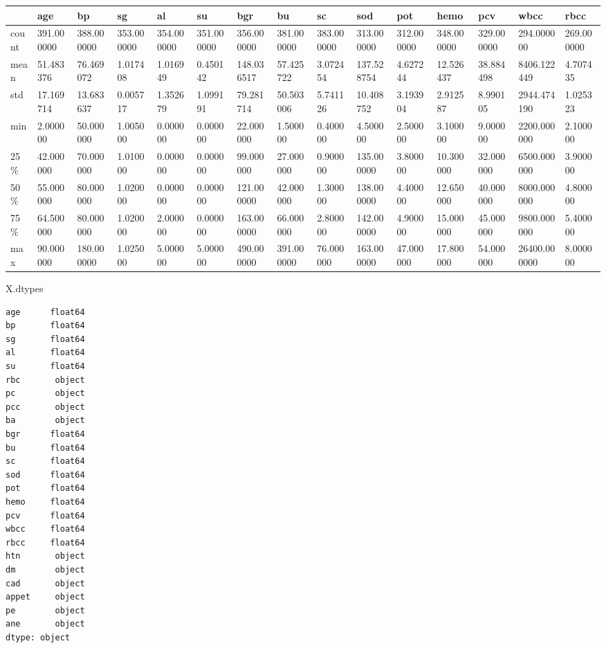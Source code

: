 \documentclass[
  11pt,
  letterpaper,
  DIV=11,
  numbers=noendperiod]{scrartcl}
\newenvironment{Shaded}{\begin{snugshade}}{\end{snugshade}}
\newcommand{\NormalTok}[1]{\textcolor[rgb]{0.00,0.23,0.31}{#1}}
\begin{document}
\begin{longtable}[]{@{}lllllllllllllll@{}}
\toprule\noalign{}
& age & bp & sg & al & su & bgr & bu & sc & sod & pot & hemo & pcv &
wbcc & rbcc \\
\midrule\noalign{}
\endhead
\bottomrule\noalign{}
\endlastfoot
count & 391.000000 & 388.000000 & 353.000000 & 354.000000 & 351.000000 &
356.000000 & 381.000000 & 383.000000 & 313.000000 & 312.000000 &
348.000000 & 329.000000 & 294.000000 & 269.000000 \\
mean & 51.483376 & 76.469072 & 1.017408 & 1.016949 & 0.450142 &
148.036517 & 57.425722 & 3.072454 & 137.528754 & 4.627244 & 12.526437 &
38.884498 & 8406.122449 & 4.707435 \\
std & 17.169714 & 13.683637 & 0.005717 & 1.352679 & 1.099191 & 79.281714
& 50.503006 & 5.741126 & 10.408752 & 3.193904 & 2.912587 & 8.990105 &
2944.474190 & 1.025323 \\
min & 2.000000 & 50.000000 & 1.005000 & 0.000000 & 0.000000 & 22.000000
& 1.500000 & 0.400000 & 4.500000 & 2.500000 & 3.100000 & 9.000000 &
2200.000000 & 2.100000 \\
25\% & 42.000000 & 70.000000 & 1.010000 & 0.000000 & 0.000000 &
99.000000 & 27.000000 & 0.900000 & 135.000000 & 3.800000 & 10.300000 &
32.000000 & 6500.000000 & 3.900000 \\
50\% & 55.000000 & 80.000000 & 1.020000 & 0.000000 & 0.000000 &
121.000000 & 42.000000 & 1.300000 & 138.000000 & 4.400000 & 12.650000 &
40.000000 & 8000.000000 & 4.800000 \\
75\% & 64.500000 & 80.000000 & 1.020000 & 2.000000 & 0.000000 &
163.000000 & 66.000000 & 2.800000 & 142.000000 & 4.900000 & 15.000000 &
45.000000 & 9800.000000 & 5.400000 \\
max & 90.000000 & 180.000000 & 1.025000 & 5.000000 & 5.000000 &
490.000000 & 391.000000 & 76.000000 & 163.000000 & 47.000000 & 17.800000
& 54.000000 & 26400.000000 & 8.000000 \\
\end{longtable}

\begin{Shaded}
\begin{Highlighting}[]
\NormalTok{X.dtypes}
\end{Highlighting}
\end{Shaded}

\begin{verbatim}
age      float64
bp       float64
sg       float64
al       float64
su       float64
rbc       object
pc        object
pcc       object
ba        object
bgr      float64
bu       float64
sc       float64
sod      float64
pot      float64
hemo     float64
pcv      float64
wbcc     float64
rbcc     float64
htn       object
dm        object
cad       object
appet     object
pe        object
ane       object
dtype: object
\end{verbatim}
\end{document}
